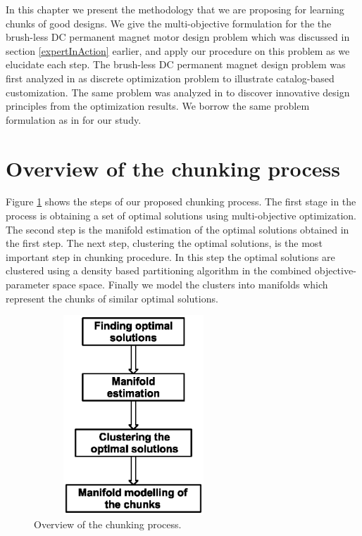
In this chapter we present the methodology that we are proposing for
learning chunks of good designs. We give the multi-objective formulation
for the the brush-less DC permanent magnet motor design problem which was
discussed in section \ref{expertInAction} earlier, and apply our procedure
on this problem as we elucidate each step.  The brush-less DC permanent
magnet design problem was first analyzed in \citep{chidam99} as discrete
optimization problem to illustrate catalog-based customization. The same
problem was analyzed in \citep{deb08} to discover innovative design
principles from the optimization results. We borrow the same problem
formulation as in \citep{deb08} for our study.

\section{Overview of the chunking process}
Figure \ref{overview} shows the steps of our proposed chunking process. The
first stage in the process is obtaining a set of optimal solutions using
multi-objective optimization. The second step is the manifold estimation of
the optimal solutions obtained in the first step. The next step, clustering
the optimal solutions, is the most important step in chunking procedure. In
this step the optimal solutions are clustered using a density based
partitioning algorithm in the combined objective-parameter space
space. Finally we model the clusters into manifolds which represent the
chunks of similar optimal solutions.
 
\begin{figure}[ht]\begin{center}
 \includegraphics[width=75mm, height=75mm]{dia/overview.eps}
 \caption{Overview of the chunking process.}
 \label{overview}
\end{center}\end{figure}



